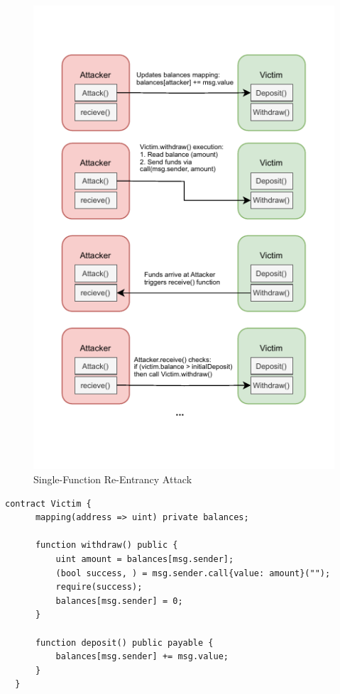 \documentclass[12pt]{article}
\begin{document}
\begin{figure}[H]
\begin{minipage}{0.45\textwidth}
  \includegraphics[width=\textwidth]{reentrancy.pdf}
\end{minipage}
\caption{Single-Function Re-Entrancy Attack}
\label{fig:reentrancy}
\end{figure}

\noindent
\begin{minipage}{\textwidth}
\begin{lstlisting}[language=Solidity, caption=Single-Function Re-Entrancy Vulnerable Contract]
  contract Victim {
      mapping(address => uint) private balances;
  
      function withdraw() public {
          uint amount = balances[msg.sender];
          (bool success, ) = msg.sender.call{value: amount}("");
          require(success);
          balances[msg.sender] = 0;
      }
  
      function deposit() public payable {
          balances[msg.sender] += msg.value;
      }
  }
\end{lstlisting}
\end{minipage}
\end{document}
